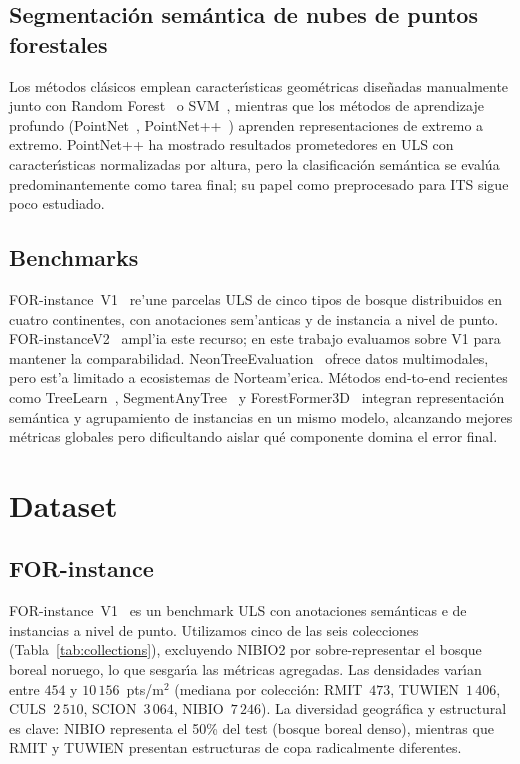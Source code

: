 \documentclass{cys}
\begin{document}
\subsection{Segmentación semántica de nubes de puntos forestales}

Los m\'etodos cl\'asicos emplean caracter\'\i{}sticas geom\'etricas dise\~nadas manualmente junto con Random Forest~\cite{breiman2001} o SVM~\cite{weinmann2015,weinmann2017}, mientras que los m\'etodos de aprendizaje profundo (PointNet~\cite{qi2016}, PointNet++~\cite{qi2017}) aprenden representaciones de extremo a extremo. PointNet++ ha mostrado resultados prometedores en ULS con caracter\'\i{}sticas normalizadas por altura, pero la clasificaci\'on sem\'antica se eval\'ua predominantemente como tarea final; su papel como preprocesado para ITS sigue poco estudiado.

\subsection{Benchmarks}

FOR-instance~V1~\cite{puliti2023} re'une parcelas ULS de cinco tipos de bosque distribuidos en cuatro continentes, con anotaciones sem'anticas y de instancia a nivel de punto. FOR-instanceV2~\cite{xiang2025} ampl'ia este recurso; en este trabajo evaluamos sobre V1 para mantener la comparabilidad. NeonTreeEvaluation~\cite{weinstein2021} ofrece datos multimodales, pero est'a limitado a ecosistemas de Norteam'erica.
Métodos end-to-end recientes como TreeLearn~\cite{henrich2024}, SegmentAnyTree~\cite{wielgosz2024} y ForestFormer3D~\cite{xiang2025} integran representación semántica y agrupamiento de instancias en un mismo modelo, alcanzando mejores métricas globales pero dificultando aislar qué componente domina el error final.

\section{Dataset}\label{sec:dataset}

\subsection{FOR-instance}

FOR-instance~V1~\cite{puliti2023} es un benchmark ULS con anotaciones sem\'anticas e de instancias a nivel de punto. Utilizamos cinco de las seis colecciones (Tabla~\ref{tab:collections}), excluyendo NIBIO2 por sobre-representar el bosque boreal noruego, lo que sesgar\'\i{}a las m\'etricas agregadas. Las densidades var\'\i{}an entre $454$ y $10\,156$~pts/m$^2$ (mediana por colecci\'on: RMIT~$473$, TUWIEN~$1\,406$, CULS~$2\,510$, SCION~$3\,064$, NIBIO~$7\,246$). La diversidad geogr\'afica y estructural es clave: NIBIO representa el 50\% del test (bosque boreal denso), mientras que RMIT y TUWIEN presentan estructuras de copa radicalmente diferentes.
\end{document}
